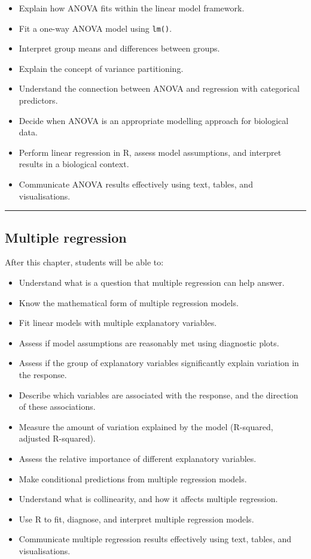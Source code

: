 \documentclass[
  letterpaper,
  8pt,
  a4paper]{book}
\providecommand{\tightlist}{%
  \setlength{\itemsep}{0pt}\setlength{\parskip}{0pt}}
\begin{document}
\begin{itemize}
\tightlist
\item
  Explain how ANOVA fits within the linear model framework.
\item
  Fit a one-way ANOVA model using \texttt{lm()}.
\item
  Interpret group means and differences between groups.
\item
  Explain the concept of variance partitioning.
\item
  Understand the connection between ANOVA and regression with
  categorical predictors.
\item
  Decide when ANOVA is an appropriate modelling approach for biological
  data.
\item
  Perform linear regression in R, assess model assumptions, and
  interpret results in a biological context.
\item
  Communicate ANOVA results effectively using text, tables, and
  visualisations.
\end{itemize}

\begin{center}\rule{0.5\linewidth}{0.5pt}\end{center}

\subsection*{Multiple regression}\label{multiple-regression}

After this chapter, students will be able to:

\begin{itemize}
\tightlist
\item
  Understand what is a question that multiple regression can help
  answer.
\item
  Know the mathematical form of multiple regression models.
\item
  Fit linear models with multiple explanatory variables.
\item
  Assess if model assumptions are reasonably met using diagnostic plots.
\item
  Assess if the group of explanatory variables significantly explain
  variation in the response.
\item
  Describe which variables are associated with the response, and the
  direction of these associations.
\item
  Measure the amount of variation explained by the model (R-squared,
  adjusted R-squared).
\item
  Assess the relative importance of different explanatory variables.
\item
  Make conditional predictions from multiple regression models.
\item
  Understand what is collinearity, and how it affects multiple
  regression.
\item
  Use R to fit, diagnose, and interpret multiple regression models.
\item
  Communicate multiple regression results effectively using text,
  tables, and visualisations.
\end{itemize}
\end{document}
